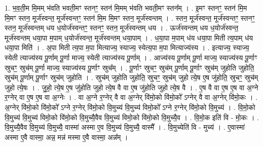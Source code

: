 \documentclass[17pt]{extarticle}
\begin{document}
1. भ॒व॒ती॒म मि॒मम् भ॑वति भवती॒मꣳ स्तनꣳ॒॒ स्तन॑ मि॒मम् भ॑वति भवती॒मꣳ स्तन᳚म् । . इ॒मꣳ स्तनꣳ॒॒ स्तन॑ मि॒म मि॒मꣳ स्तन॒ मूर्ज॑स्वन्त॒ मूर्ज॑स्वन्तꣳ॒॒ स्तन॑ मि॒म मि॒मꣳ स्तन॒ मूर्ज॑स्वन्तम् । . स्तन॒ मूर्ज॑स्वन्त॒ मूर्ज॑स्वन्तꣳ॒॒ स्तनꣳ॒॒ स्तन॒ मूर्ज॑स्वन्तम् धय ध॒योर्ज॑स्वन्तꣳ॒॒ स्तनꣳ॒॒ स्तन॒ मूर्ज॑स्वन्तम् धय । . ऊर्ज॑स्वन्तम् धय ध॒योर्ज॑स्वन्त॒ मूर्ज॑स्वन्तम् धया॒पा म॒पाम् ध॒योर्ज॑स्वन्त॒ मूर्ज॑स्वन्तम् धया॒पाम् । . ध॒या॒पा म॒पाम् ध॑य धया॒पा मिती त्य॒पाम् ध॑य धया॒पा मिति॑ । . अ॒पा मिती त्य॒पा म॒पा मित्याज्य॒ स्याज्य॒ स्येत्य॒पा म॒पा मित्याज्य॑स्य । . इत्याज्य॒ स्याज्य॒ स्येती त्याज्य॑स्य पू॒र्णाम् पू॒र्णा माज्य॒ स्येती त्याज्य॑स्य पू॒र्णाम् । . आज्य॑स्य पू॒र्णाम् पू॒र्णा माज्य॒ स्याज्य॑स्य पू॒र्णाꣳ स्रुचꣳ॒॒ स्रुच॑म् पू॒र्णा माज्य॒ स्याज्य॑स्य पू॒र्णाꣳ स्रुच᳚म् । . पू॒र्णाꣳ स्रुचꣳ॒॒ स्रुच॑म् पू॒र्णाम् पू॒र्णाꣳ स्रुच॑म् जुहोति जुहोति॒ स्रुच॑म् पू॒र्णाम् पू॒र्णाꣳ स्रुच॑म् जुहोति । . स्रुच॑म् जुहोति जुहोति॒ स्रुचꣳ॒॒ स्रुच॑म् जुहो त्ये॒ष ए॒ष जु॑होति॒ स्रुचꣳ॒॒ स्रुच॑म् जुहो त्ये॒षः । . जु॒हो॒ त्ये॒ष ए॒ष जु॑होति जुहो त्ये॒ष वै वा ए॒ष जु॑होति जुहो त्ये॒ष वै । . ए॒ष वै वा ए॒ष ए॒ष वा अ॒ग्ने र॒ग्नेर् वा ए॒ष ए॒ष वा अ॒ग्नेः । . वा अ॒ग्ने र॒ग्नेर् वै वा अ॒ग्नेर् वि॑मो॒को वि॑मो॒को᳚ ऽग्नेर् वै वा अ॒ग्नेर् वि॑मो॒कः । . अ॒ग्नेर् वि॑मो॒को वि॑मो॒को᳚ ऽग्ने र॒ग्नेर् वि॑मो॒को वि॒मुच्य॑ वि॒मुच्य॑ विमो॒को᳚ ऽग्ने र॒ग्नेर् वि॑मो॒को वि॒मुच्य॑ । . वि॒मो॒को वि॒मुच्य॑ वि॒मुच्य॑ विमो॒को वि॑मो॒को वि॒मुच्यै॒वैव वि॒मुच्य॑ विमो॒को वि॑मो॒को वि॒मुच्यै॒व । . वि॒मो॒क इति॑ वि - मो॒कः । . वि॒मुच्यै॒वैव वि॒मुच्य॑ वि॒मुच्यै॒ वास्मा॑ अस्मा ए॒व वि॒मुच्य॑ वि॒मुच्यै॒ वास्मै᳚ । . वि॒मुच्येति॑ वि - मुच्य॑ । . ए॒वास्मा॑ अस्मा ए॒वै वास्मा॒ अन्न॒ मन्न॑ मस्मा ए॒वै वास्मा॒ अन्न᳚म् । \newline
\end{document}
